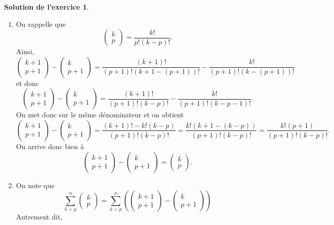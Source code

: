 \documentclass[a4paper, 11pt,openany]{article}%
\theoremstyle{plain}
\theoremstyle{definition}
\newtheorem{sol}{Solution de l'exercice}
\theoremstyle{remark}
\begin{document}
\begin{sol}
\begin{enumerate}
      \item On rappelle que
      \[ \begin{pmatrix} k \\ p \end{pmatrix}  =   \frac{k!}{p! (k-p)!}.\]
      Ainsi,
      \[ \begin{pmatrix} k+1 \\ p+1 \end{pmatrix} - \begin{pmatrix} k \\ p+1 \end{pmatrix} = \frac{(k+1)!}{(p+1)! (k+1-(p+1))!} - \frac{k!}{(p+1)! (k-(p+1))!}\]
      et donc
      \[ \begin{pmatrix} k+1 \\ p+1 \end{pmatrix} - \begin{pmatrix} k \\ p+1 \end{pmatrix}
      = \frac{(k+1)!}{(p+1)! (k-p)!} - \frac{k!}{(p+1)! (k-p-1)!}.\]
      On met donc sur le même dénominateur et on obtient
      \[ \begin{pmatrix} k+1 \\ p+1 \end{pmatrix} - \begin{pmatrix} k \\ p+1 \end{pmatrix}
      = \frac{(k+1)! - k! (k-p)}{(p+1)! (k-p)!}  = \frac{k! (k+1  - (k-p))}{(p+1)! (k-p)!}   = \frac{k! (p+1)}{(p+1)! (k-p)!}.\]
      On arrive donc bien à
      \[ \begin{pmatrix} k+1 \\ p+1 \end{pmatrix} - \begin{pmatrix} k \\ p+1 \end{pmatrix} = \begin{pmatrix} k \\ p \end{pmatrix}.\]
      \item On note que
      \[ \sum_{k=p}^n \begin{pmatrix} k \\ p \end{pmatrix} = \sum_{k=p}^n \left( \begin{pmatrix} k+1 \\ p+1 \end{pmatrix} - \begin{pmatrix} k \\ p+1 \end{pmatrix} \right)\]
      Autrement dit,
     

\end{enumerate}
\end{sol}
\end{document}
